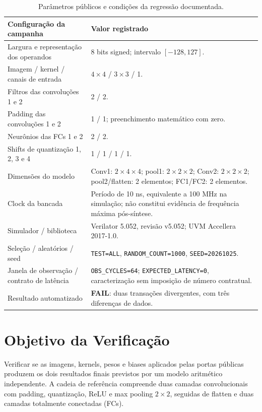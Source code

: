 \documentclass[12pt,a4paper]{article}
\begin{document}
\begin{table}[H]\centering\small
\begin{tabularx}{\textwidth}{p{7.8cm}X}\toprule
\textbf{Configuração da campanha} & \textbf{Valor registrado}\\\midrule
Largura e representação dos operandos & 8 bits signed; intervalo $[-128,127]$.\\
Imagem / kernel / canais de entrada & $4\times4$ / $3\times3$ / 1.\\
Filtros das convoluções 1 e 2 & 2 / 2.\\
Padding das convoluções 1 e 2 & 1 / 1; preenchimento matemático com zero.\\
Neurônios das FCs 1 e 2 & 2 / 2.\\
Shifts de quantização 1, 2, 3 e 4 & 1 / 1 / 1 / 1.\\
Dimensões do modelo & Conv1: $2\times4\times4$; pool1: $2\times2\times2$; Conv2: $2\times2\times2$; pool2/flatten: 2 elementos; FC1/FC2: 2 elementos.\\
Clock da bancada & Período de 10 ns, equivalente a 100 MHz na simulação; não constitui evidência de frequência máxima pós-síntese.\\
Simulador / biblioteca & Verilator 5.052, revisão v5.052; UVM Accellera 2017-1.0.\\
Seleção / aleatórios / seed & \texttt{TEST=ALL}, \texttt{RANDOM\_COUNT=1000}, \texttt{SEED=20261025}.\\
Janela de observação / contrato de latência & \texttt{OBS\_CYCLES=64}; \texttt{EXPECTED\_LATENCY=0}, caracterização sem imposição de número contratual.\\
Resultado automatizado & \textbf{FAIL}: duas transações divergentes, com três diferenças de dados.\\\bottomrule
\end{tabularx}
\caption{Parâmetros públicos e condições da regressão documentada.}
\end{table}

\section{Objetivo da Verificação}
Verificar se as imagens, kernels, pesos e biases aplicados pelas portas públicas produzem os dois resultados finais previstos por um modelo aritmético independente. A cadeia de referência compreende duas camadas convolucionais com padding, quantização, ReLU e max pooling $2\times2$, seguidas de flatten e duas camadas totalmente conectadas (FCs).
\end{document}
